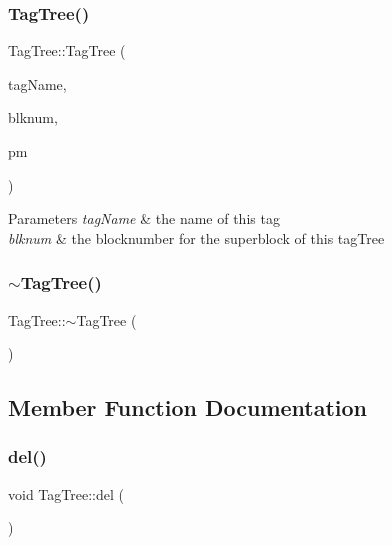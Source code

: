 \subsubsection{\texorpdfstring{Tag\+Tree()}{TagTree()}}
{\footnotesize\ttfamily Tag\+Tree\+::\+Tag\+Tree (\begin{DoxyParamCaption}\item[{string}]{tag\+Name,  }\item[{Blk\+Num\+Type}]{blknum,  }\item[{\mbox{\hyperlink{class_partition_manager}{Partition\+Manager}} $\ast$}]{pm }\end{DoxyParamCaption})}


\begin{DoxyParams}{Parameters}
{\em tag\+Name} & the name of this tag \\
\hline
{\em blknum} & the blocknumber for the superblock of this tag\+Tree \\
\hline
\end{DoxyParams}
\mbox{\label{class_tag_tree_a0522ae8933fa3e903fc1da7bdfb5d901}} 
\subsubsection{\texorpdfstring{$\sim$\+Tag\+Tree()}{~TagTree()}}
{\footnotesize\ttfamily Tag\+Tree\+::$\sim$\+Tag\+Tree (\begin{DoxyParamCaption}{ }\end{DoxyParamCaption})}



\subsection{Member Function Documentation}
\mbox{\label{class_tag_tree_ad8108969f4d28b938e55c8339f19db35}} 
\subsubsection{\texorpdfstring{del()}{del()}}
{\footnotesize\ttfamily void Tag\+Tree\+::del (\begin{DoxyParamCaption}{ }\end{DoxyParamCaption})\hspace{0.3cm}{\ttfamily [virtual]}}

